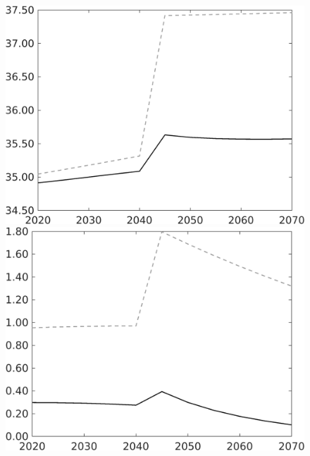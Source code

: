 \begin{figure}[h!!]
	\begin{minipage}[]{0.32\textwidth}
		\includegraphics[width=1\textwidth]{../../codding_model/own_basedOnFried/optimalPol_010922_revision/figures/all_13Sept22/CompTaufPER_bytaul_KN_Reg0_gAf_spillover0_nsk0_xgr0_knspil0_sep0_LFlimit1_emsbase0_countec0_GovRev0_etaa0.79_lgd0.png} 
	\end{minipage}	
	\begin{minipage}[]{0.32\textwidth}
		\includegraphics[width=1\textwidth]{../../codding_model/own_basedOnFried/optimalPol_010922_revision/figures/all_13Sept22/CompTaufPER_bytaul_KN_Reg0_gAn_spillover0_nsk0_xgr0_knspil0_sep0_LFlimit1_emsbase0_countec0_GovRev0_etaa0.79_lgd0.png} \end{minipage}	

\end{figure}
